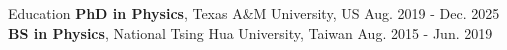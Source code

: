 \documentclass{resume}
\begin{document}

\begin{rSection}{Education}
    {\bf PhD in Physics}, Texas A\&M University, US \hfill {Aug. 2019 - Dec. 2025} \\
    {\bf BS in Physics}, National Tsing Hua University, Taiwan \hfill {Aug. 2015 - Jun. 2019}
\end{rSection}
\end{document}
